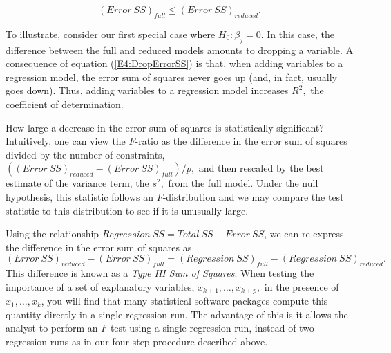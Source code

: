 \begin{equation}\label{E4:DropErrorSS}
(Error~SS)_{full}\leq (Error~SS)_{reduced}.
\end{equation}



To illustrate, consider our first special case where $H_0 : \beta_j
= 0$. In this case, the difference between the full and reduced
models amounts to dropping a variable. A consequence of equation
(\ref{E4:DropErrorSS}) is that, when adding variables to a
regression model, the error sum of squares never goes up (and, in
fact, usually goes down). Thus, adding variables to a regression
model increases $R^2,$ the coefficient of determination.

How large a decrease in the error sum of squares is statistically
significant? Intuitively, one can view the $F$-ratio as the
difference in the error sum of squares divided by the number of
constraints, $((Error~SS)_{reduced}-(Error~SS)_{full})/p,$ and then
rescaled by the best estimate of the variance term, the $s^2,$ from
the full model. Under the null hypothesis, this statistic follows an
$F$-distribution and we may compare the test statistic to this
distribution to see if it is unusually large.

Using the relationship $Regression~SS=Total~SS-Error~SS$, we can
re-express the difference in the error sum of squares as
\begin{equation*}
(Error~SS)_{reduced}-(Error~SS)_{full}=(Regression~SS)_{full}-(Regression~SS)_{reduced}.
\end{equation*} 
This difference is known as a \emph{Type III Sum of Squares}. When
testing the importance of a set of explanatory variables,
$x_{k+1},\ldots,x_{k+p},$ in the presence of $x_1,\ldots,x_k$, you
will find that many statistical software packages compute this
quantity directly in a single regression run. The advantage of this
is it allows the analyst to perform an $F$-test using a single
regression run, instead of two regression runs as in our four-step
procedure described above.

\linejed {}

